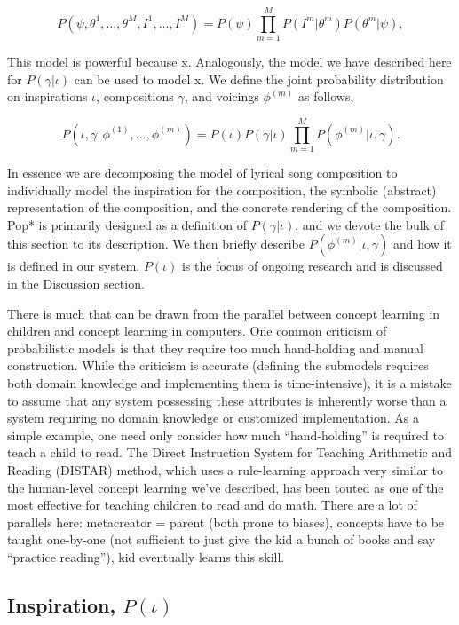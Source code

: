 \documentclass[letterpaper]{article}
\begin{document}
\begin{equation} \label{eq:2}
P(\psi, \theta^1, \dots,\theta^M,I^1,\dots,I^M) = P(\psi) \prod_{m=1}^{M} P(I^m|\theta^m)P(\theta^m|\psi),
\end{equation}

This model is powerful because x. Analogously, the model we have described here for $P(\gamma|\iota)$ can be used to model x. We define the joint probability distribution on inspirations $\iota$, compositions $\gamma$, and voicings $\phi^{(m)}$ as follows,

\[ P(\iota,\gamma,\phi^{(1)}, ..., \phi^{(m)}) = P(\iota)P(\gamma|\iota) \prod_{m=1}^{M} P(\phi^{(m)}|\iota,\gamma). \]

In essence we are decomposing the model of lyrical song composition to individually model the inspiration for the composition, the symbolic (abstract) representation of the composition, and the concrete rendering of the composition. Pop* is primarily designed as a definition of $P(\gamma|\iota)$, and we devote the bulk of this section to its description. We then briefly describe $P(\phi^{(m)}|\iota,\gamma)$ and how it is defined in our system. $P(\iota)$ is the focus of ongoing research and is discussed in the Discussion section.


There is much that can be drawn from the parallel between concept learning in children and concept learning in computers. One common criticism of probabilistic models is that they require too much hand-holding and manual construction. While the criticism is accurate (defining the submodels requires both domain knowledge and implementing them is time-intensive), it is a mistake to assume that any system possessing these attributes is inherently worse than a system requiring no domain knowledge or customized implementation. As a simple example, one need only consider how much ``hand-holding'' is required to teach a child to read. The Direct Instruction System for Teaching Arithmetic and Reading (DISTAR) method, which uses a rule-learning approach very similar to the human-level concept learning we've described, has been touted as one of the most effective for teaching children to read and do math. There are a lot of parallels here: metacreator = parent (both prone to biases), concepts have to be taught one-by-one (not sufficient to just give the kid a bunch of books and say ``practice reading''), kid eventually learns this skill.

\subsection{Inspiration, $P(\iota)$}
\end{document}
